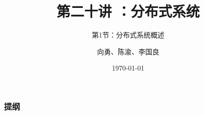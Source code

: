 


\title[第19讲]{第二十讲 ：分布式系统} %
\subtitle{第1节：分布式系统概述}
\author{向勇、陈渝、李国良} %
\date{\today} %


    
    \begin{frame}
        \titlepage %
    \end{frame}
    
    \begin{frame}
        \frametitle{提纲} %
        \tableofcontents %
        
        
    \end{frame}
